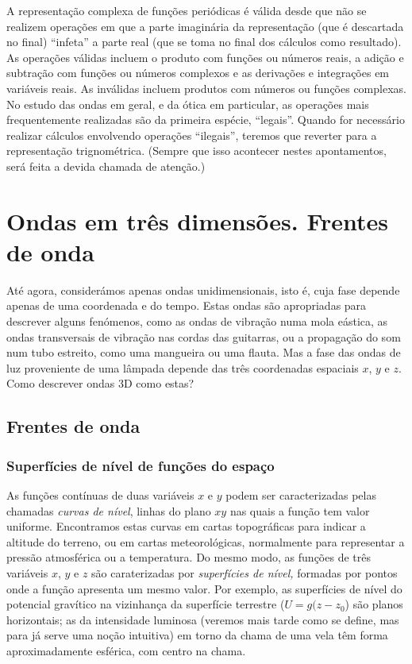 A representação complexa de funções periódicas é válida desde que não se
realizem operações em que a parte imaginária da representação (que é descartada
no final) ``infeta'' a parte real (que se toma no final dos cálculos como
resultado). As operações válidas incluem o produto com funções ou números reais, a adição e
subtração com funções ou números complexos e as derivações e integrações em
variáveis reais. As inválidas incluem produtos com números ou funções complexas.
No estudo das ondas em geral, e da ótica em particular, as operações mais
frequentemente realizadas são da primeira espécie, ``legais''. Quando for
necessário realizar cálculos envolvendo operações ``ilegais'', teremos que
reverter para a representação trignométrica. (Sempre que isso acontecer nestes
apontamentos, será feita a devida chamada de atenção.)

\section{Ondas em três dimensões. Frentes de onda}
Até agora, considerámos apenas ondas unidimensionais, isto é, cuja fase depende
apenas de uma coordenada e do tempo. Estas ondas são apropriadas para descrever
alguns fenómenos, como as ondas de vibração numa mola eástica, as ondas
transversais de vibração nas cordas das guitarras, ou a propagação do som num
tubo estreito, como uma mangueira ou uma flauta. Mas a fase das ondas de luz
proveniente de uma lâmpada depende das três coordenadas espaciais $x$, $y$ e
$z$. Como descrever ondas 3D como estas?



\subsection{Frentes de onda}
\subsubsection*{Superfícies de nível de funções do espaço}
As funções contínuas de duas variáveis $x$ e $y$ podem ser caracterizadas pelas
chamadas \emph{curvas de nível}, linhas do plano $xy$ nas quais a função tem
valor uniforme. Encontramos estas curvas em cartas topográficas para indicar a
altitude do terreno, ou em cartas meteorológicas, normalmente para representar a
pressão atmosférica ou a temperatura. Do mesmo modo, as funções de três
variáveis $x$, $y$ e $z$ são caraterizadas por \emph{superfícies de nível,}
formadas por pontos onde a função apresenta um mesmo valor. Por exemplo, as
superfícies de nível do potencial gravítico na vizinhança da superfície
terrestre ($U=g(z-z_0$) são planos horizontais; as da intensidade luminosa
(veremos mais tarde como se define, mas para já serve uma noção intuitiva) em
torno da chama de uma vela têm forma aproximadamente esférica, com centro na
chama.

